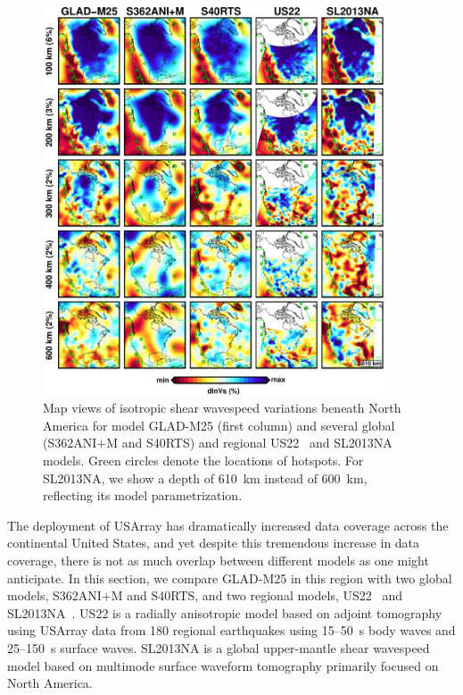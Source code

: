 \begin{figure}
\centering
\includegraphics[width=0.9\textwidth]{ch-GLADM25/figures/depth_slice/america_vs.pdf}
  \caption{\small{Map views of isotropic shear wavespeed variations beneath North America 
  for model GLAD-M25 (first column) and several global (S362ANI$+$M and S40RTS)
  and regional US22~\cite{zhu2017radial} and SL2013NA~\cite{schaeffer2014imaging}
  models. Green circles denote the locations of hotspots. For SL2013NA, we
  show a depth of 610~km instead of 600~km, reflecting its model parametrization.}}
\label{fig:america-vs}
\end{figure}

The deployment of USArray has dramatically increased data coverage across the
continental United States,
and yet despite this tremendous increase in data coverage, there is not as much overlap between different models as one might anticipate.
In this section, we compare GLAD-M25 in this region 
with two global models, S362ANI$+$M and S40RTS, and two regional models,
US22~\cite{zhu2017radial} and SL2013NA~\cite{schaeffer2014imaging}.
US22 is a radially anisotropic model based on adjoint tomography using
USArray data from 180 regional earthquakes using 15--50~s
body waves and 25--150~s surface waves.
SL2013NA is a global upper-mantle shear wavespeed model based on multimode
surface waveform tomography primarily focused on North America.

